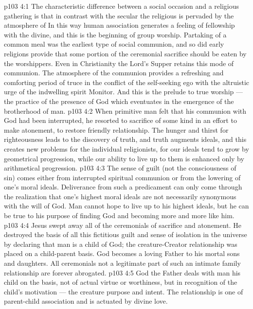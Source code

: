 \vs p103 4:1 The characteristic difference between a social occasion and a religious gathering is that in contrast with the secular the religious is pervaded by the atmosphere of  In this way human association generates a feeling of fellowship with the divine, and this is the beginning of group worship. Partaking of a common meal was the earliest type of social communion, and so did early religions provide that some portion of the ceremonial sacrifice should be eaten by the worshippers. Even in Christianity the Lord’s Supper retains this mode of communion. The atmosphere of the communion provides a refreshing and comforting period of truce in the conflict of the self\hyp{}seeking ego with the altruistic urge of the indwelling spirit Monitor. And this is the prelude to true worship --- the practice of the presence of God which eventuates in the emergence of the brotherhood of man.
\vs p103 4:2 When primitive man felt that his communion with God had been interrupted, he resorted to sacrifice of some kind in an effort to make atonement, to restore friendly relationship. The hunger and thirst for righteousness leads to the discovery of truth, and truth augments ideals, and this creates new problems for the individual religionists, for our ideals tend to grow by geometrical progression, while our ability to live up to them is enhanced only by arithmetical progression.
\vs p103 4:3 The sense of guilt (not the consciousness of sin) comes either from interrupted spiritual communion or from the lowering of one’s moral ideals. Deliverance from such a predicament can only come through the realization that one’s highest moral ideals are not necessarily synonymous with the will of God. Man cannot hope to live up to his highest ideals, but he can be true to his purpose of finding God and becoming more and more like him.
\vs p103 4:4 Jesus swept away all of the ceremonials of sacrifice and atonement. He destroyed the basis of all this fictitious guilt and sense of isolation in the universe by declaring that man is a child of God; the creature\hyp{}Creator relationship was placed on a child\hyp{}parent basis. God becomes a loving Father to his mortal sons and daughters. All ceremonials not a legitimate part of such an intimate family relationship are forever abrogated.
\vs p103 4:5 God the Father deals with man his child on the basis, not of actual virtue or worthiness, but in recognition of the child’s motivation --- the creature purpose and intent. The relationship is one of parent\hyp{}child association and is actuated by divine love.

